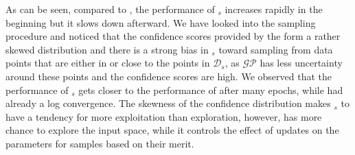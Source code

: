 As can be seen, compared to \fwl, the performance of \fwlnospace$_s$ increases rapidly in the beginning but it slows down afterward. 
We have looked into the sampling procedure and noticed that the confidence scores provided by the \tch form a rather skewed distribution and there is a strong bias in \fwlnospace$_s$ toward sampling from data points that are either in or close to the points in $\mathcal{D}_{s}$, as $\mathcal{GP}$ has less uncertainty around these points and the confidence scores are high.
We observed that the performance of \fwlnospace$_s$ gets closer to the performance of \fwl after many epochs, while \fwl had already a log convergence.
%
The skewness of the confidence distribution makes \fwlnospace$_s$ to have a tendency for more exploitation than exploration, however, \fwl has more chance to explore the input space, while it controls the effect of updates on the parameters for samples based on their merit. 